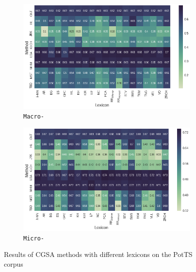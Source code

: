 \begin{figure}
{
\centering
\begin{subfigure}{.5\textwidth}
  \centering
  \includegraphics[width=\linewidth]{img/cgsa_potts_macro_lexicons.png}
  \caption{\texttt{Macro-\F{}}}\label{cgsa:fig:potts-lexicon-macro}
\end{subfigure}%
\begin{subfigure}{.5\textwidth}
  \centering
  \includegraphics[width=\linewidth]{img/cgsa_potts_micro_lexicons.png}
  \caption{\texttt{Micro-\F{}}}\label{cgsa:fig:potts-lexicon-micro}
\end{subfigure}
}
\caption[PotTS Results with Different Lexicons]{Results of CGSA
  methods with different lexicons on the PotTS
  corpus}\label{cgsa:fig:potts-lexicon-effect}
\end{figure}

